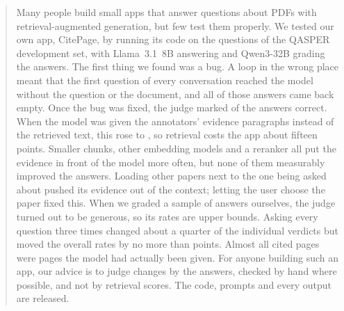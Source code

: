 \begin{abstract}
Many people build small apps that answer questions about PDFs with retrieval-augmented
generation, but few test them properly. We tested our own app, CitePage, by running its code on
the \BaselineQuestions{} questions of the QASPER development set, with Llama~3.1~8B answering
and Qwen3-32B grading the answers. The first thing we found was a bug. A loop in the wrong place
meant that the first question of every conversation reached the model without the question or
the document, and all \ShippedEmpty{} of those answers came back empty. Once the bug was fixed,
the judge marked \FixedCorrectRate{} of the answers correct. When the model was given the
annotators' evidence paragraphs instead of the retrieved text, this rose to \OracleCorrectRate{},
so retrieval costs the app about fifteen points. Smaller chunks, other embedding models and a
reranker all put the evidence in front of the model more often, but none of them measurably
improved the answers. Loading other papers next to the one being asked about pushed its evidence
out of the context; letting the user choose the paper fixed this. When we graded a sample of
answers ourselves, the judge turned out to be generous, so its rates are upper bounds. Asking
every question three times changed about a quarter of the individual verdicts but moved the
overall rates by no more than \RepeatWidestPoints{} points. Almost all cited pages were pages the
model had actually been given. For anyone building such an app, our advice is to judge changes
by the answers, checked by hand where possible, and not by retrieval scores. The code, prompts
and every output are released.
\end{abstract}
